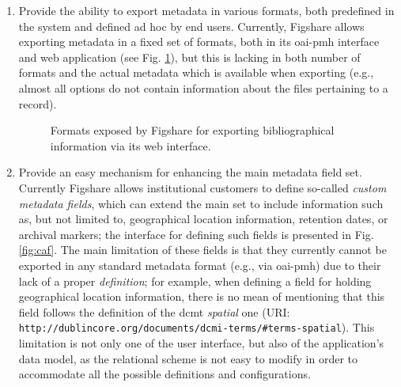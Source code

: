 \begin{enumerate}
    \item Provide the ability to export metadata in various formats, both predefined in the system and defined ad hoc by end users. Currently, Figshare allows exporting metadata in a fixed set of formats, both in its \gls{oai}-\gls{pmh} interface and web application (see Fig. \ref{fig:figexport}), but this is lacking in both number of formats and the actual metadata which is available when exporting (e.g., almost all options do not contain information about the files pertaining to a record).

    \begin{figure}[thpb]
        \centering
        \caption{Formats exposed by Figshare for exporting bibliographical information via its web interface.}
        \label{fig:figexport}
    \end{figure}

    \item Provide an easy mechanism for enhancing the main metadata field set. Currently Figshare allows institutional customers to define so-called \emph{custom metadata fields}, which can extend the main set to include information such as, but not limited to, geographical location information, retention dates, or archival markers; the interface for defining such fields is presented in Fig. \ref{fig:caf}. The main limitation of these fields is that they currently cannot be exported in any standard metadata format (e.g., via \gls{oai}-\gls{pmh}) due to their lack of a proper \emph{definition}; for example, when defining a field for holding geographical location information, there is no mean of mentioning that this field follows the definition of the \gls{dcmt} \emph{spatial} one (URI: \nolinkurl{http://dublincore.org/documents/dcmi-terms/#terms-spatial}). This limitation is not only one of the user interface, but also of the application's data model, as the relational scheme is not easy to modify in order to accommodate all the possible definitions and configurations.


\end{enumerate}
